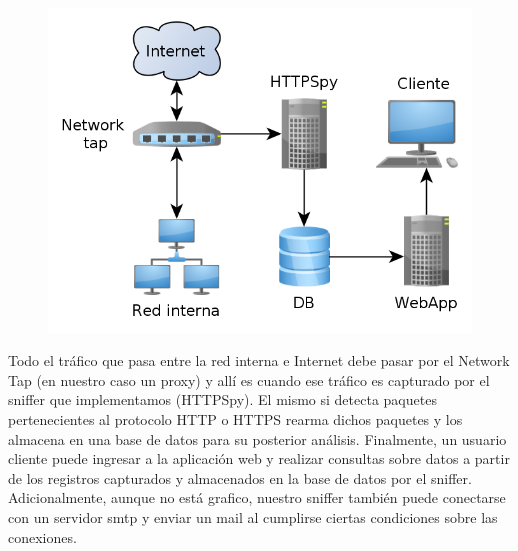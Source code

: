 \begin{figure}[hbtp]
    \centering
	\includegraphics[scale=0.4]{img/deploy.png}
\end{figure}

Todo el tráfico que pasa entre la red interna e Internet debe pasar por el Network Tap (en nuestro caso un proxy) y allí es cuando ese tráfico es capturado por el sniffer que implementamos (HTTPSpy). El mismo si detecta paquetes pertenecientes al protocolo HTTP o HTTPS rearma dichos paquetes y los almacena en una base de datos para su posterior análisis. Finalmente, un usuario cliente puede ingresar a la aplicación web y realizar consultas sobre datos a partir de los registros capturados y almacenados en la base de datos por el sniffer.
Adicionalmente, aunque no está grafico, nuestro sniffer también puede conectarse con un servidor smtp y enviar un mail al cumplirse ciertas condiciones sobre las conexiones.
